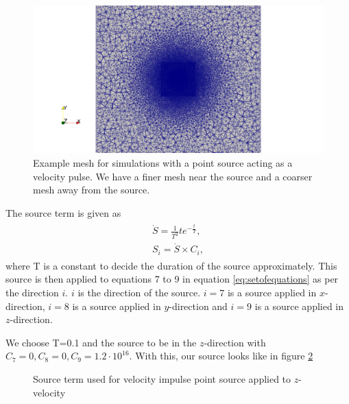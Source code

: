 \begin{figure}[!htpb]
    \centering
    \includegraphics[width=\linewidth]{figures/mesh_loh1.png}
    \caption{Example mesh for simulations with a point source acting as a velocity pulse. We have a finer mesh near the source and a coarser mesh away from the source.}
    \label{fig:mesh-loh1}
\end{figure}

The source term is given as 
\begin{align}
    \begin{split}
        \dot{S} = \frac{1}{T^2} t e^{-\frac{t}{T}} , \\
        S_i = \dot{S} \times C_i ,
    \end{split}
    \label{eq:source}
\end{align}
where T is a constant to decide the duration of the source approximately. This source is then applied to equations 7 to 9 in equation \ref{eq:setofequations} as per the direction
$i$. $i$ is the direction of the source. $i=7$ is a source applied in $x$-direction,
$i=8$ is a source applied in $y$-direction and $i=9$ is a source applied in $z$-direction.

We choose T=0.1 and the source to be in the $z$-direction with $C_7 = 0, C_8 = 0, C_9 = 1.2 \cdot 10^{16}$. With this, our source looks like in figure \ref{fig:source}

\begin{figure}[htpb]
    \centering
    \caption{Source term used for velocity impulse point source applied to $z$-velocity}
    \label{fig:source}
\end{figure}


